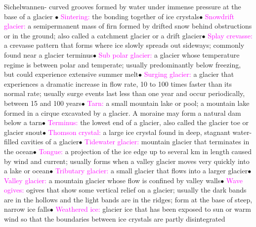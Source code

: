 \documentclass{article}
\newcommand{\ddd}{$\bullet$}
\newcommand{\pink}[1]{\textcolor{magenta}{#1}}
\newcommand{\vocab}[1]{{\pink{#1}}}
\begin{document}
\begin{multicols*}{4}
		\vocab{ }        Sichelwannen- curved grooves formed by water under immense pressure at the base of a glacier \ddd
		\vocab{        Sintering: } the bonding together of ice crystals\ddd
		\vocab{        Snowdrift glacier: } a semipermanent mass of firn formed by drifted snow behind obstructions or in the ground; also called a catchment glacier or a drift glacier\ddd
		\vocab{        Splay crevasse: } a crevasse pattern that forms where ice slowly spreads out sideways; commonly found near a glacier terminus\ddd
		\vocab{        Sub polar glacier: } a glacier whose temperature regime is between polar and temperate; usually predominantly below freezing, but could experience extensive summer melt\ddd
		\vocab{        Surging glacier: } a glacier that experiences a dramatic increase in flow rate, 10 to 100 times faster than its normal rate; usually surge events last less than one year and occur periodically, between 15 and 100 years\ddd
		\vocab{        Tarn: } a small mountain lake or pool; a mountain lake formed in a cirque excavated by a glacier. A moraine may form a natural dam below a tarn\ddd
		\vocab{        Terminus: } the lowest end of a glacier, also called the glacier toe or glacier snout\ddd
		\vocab{        Thomson crystal: } a large ice crystal found in deep, stagnant water-filled cavities of a glacier\ddd
		\vocab{        Tidewater glacier: } mountain glacier that terminates in the ocean\ddd
		\vocab{        Tongue: } a projection of the ice edge up to several km in length caused by wind and current; usually forms when a valley glacier moves very quickly into a lake or ocean\ddd
		\vocab{        Tributary glacier: } a small glacier that flows into a larger glacier\ddd
		\vocab{        Valley glacier: } a mountain glacier whose flow is confined by valley walls\ddd
		\vocab{        Wave ogives: } ogives that show some vertical relief on a glacier; usually the dark bands are in the hollows and the light bands are in the ridges; form at the base of steep, narrow ice falls\ddd
		\vocab{        Weathered ice: } glacier ice that has been exposed to sun or warm wind so that the boundaries between ice crystals are partly disintegrated

	   	
	\end{multicols*}
\end{document}

